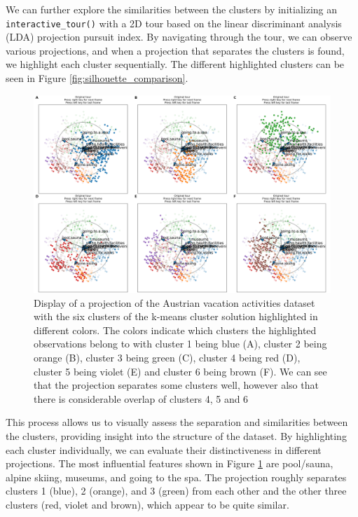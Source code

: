 \documentclass[article]{ajs}
\begin{document}
We can further explore the similarities between the clusters by initializing an \texttt{interactive\_tour()} with a 2D tour based on the linear discriminant analysis (LDA) projection pursuit index. By navigating through the tour, we can observe various projections, and when a projection that separates the clusters is found, we highlight each cluster sequentially. The different highlighted clusters can be seen in Figure \ref{fig:silhouette_comparison}.

\begin{figure}[h!]
    \centering
    \includegraphics[width=1\textwidth]{winter_activ_cluster_highlights.png}
    \caption{Display of a projection of the Austrian vacation activities dataset with the six clusters of the k-means cluster solution highlighted in different colors. The colors indicate which clusters the highlighted observations belong to with cluster 1 being blue (A), cluster 2 being orange (B), cluster 3 being green (C), cluster 4 being red (D), cluster 5 being violet (E) and cluster 6 being brown (F). We can see that the projection separates some clusters well, however also that there is considerable overlap of clusters 4, 5 and 6}
    \label{fig:winter_activ_cluster_highlights}
\end{figure}

This process allows us to visually assess the separation and similarities between the clusters, providing insight into the structure of the dataset. By highlighting each cluster individually, we can evaluate their distinctiveness in different projections. The most influential features shown in Figure \ref{fig:winter_activ_cluster_highlights} are pool/sauna, alpine skiing, museums, and going to the spa. The projection roughly separates clusters 1 (blue), 2 (orange), and 3 (green) from each other and the other three clusters (red, violet and brown), which appear to be quite similar. 
\end{document}
